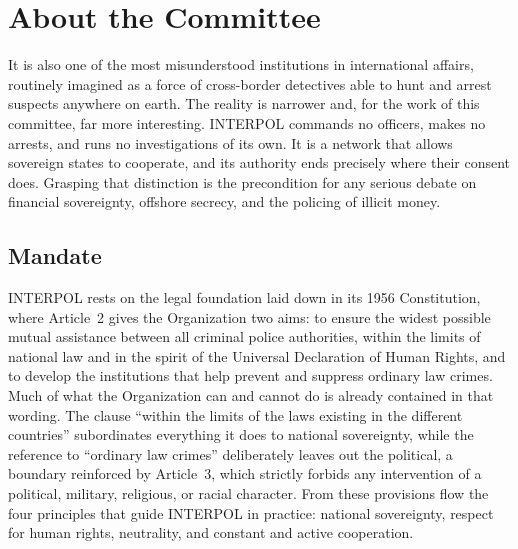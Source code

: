 \section{About the Committee}


It is also one of the most misunderstood institutions in international affairs, routinely imagined as a force of cross-border detectives able to hunt and arrest suspects anywhere on earth. The reality is narrower and, for the work of this committee, far more interesting. INTERPOL commands no officers, makes no arrests, and runs no investigations of its own. It is a network that allows sovereign states to cooperate, and its authority ends precisely where their consent does. Grasping that distinction is the precondition for any serious debate on financial sovereignty, offshore secrecy, and the policing of illicit money.

\subsection{Mandate}

INTERPOL rests on the legal foundation laid down in its 1956 Constitution, where Article~2 gives the Organization two aims: to ensure the widest possible mutual assistance between all criminal police authorities, within the limits of national law and in the spirit of the Universal Declaration of Human Rights, and to develop the institutions that help prevent and suppress ordinary law crimes. Much of what the Organization can and cannot do is already contained in that wording. The clause ``within the limits of the laws existing in the different countries'' subordinates everything it does to national sovereignty, while the reference to ``ordinary law crimes'' deliberately leaves out the political, a boundary reinforced by Article~3, which strictly forbids any intervention of a political, military, religious, or racial character. From these provisions flow the four principles that guide INTERPOL in practice: national sovereignty, respect for human rights, neutrality, and constant and active cooperation.


